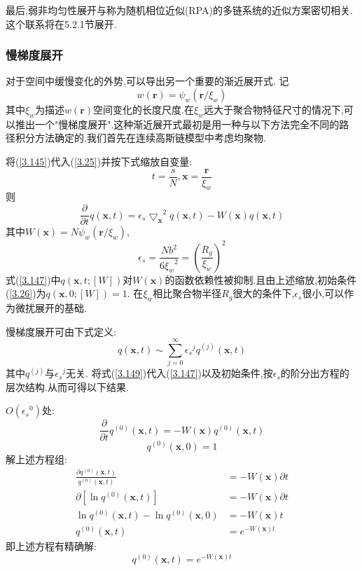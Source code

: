 最后,弱非均匀性展开与称为随机相位近似(RPA)的多链系统的近似方案密切相关.这个联系将在5.2.1节展开.

\subsubsection{慢梯度展开}
对于空间中缓慢变化的外势,可以导出另一个重要的渐近展开式.
记
\begin{equation}
w(\mathbf{r}) = \psi_w(\mathbf{r}/\xi_w) \label{3.145}
\end{equation}
其中$\xi_w$为描述$w(\mathbf{r})$空间变化的长度尺度.在$\xi_w$远大于聚合物特征尺寸的情况下,可以推出一个"慢梯度展开".这种渐近展开式最初是用一种与以下方法完全不同的路径积分方法确定的.我们首先在连续高斯链模型中考虑均聚物.

将(\ref{3.145})代入(\ref{3.25})并按下式缩放自变量:
\begin{equation}
t = \frac{s}{N},	\mathbf{x} = \frac{\mathbf{r}}{\xi_w}
\end{equation}
则
\begin{equation}
\frac{\partial}{\partial t}q(\mathbf{x},t) = \epsilon_s {\bigtriangledown_\mathbf{x}}^2 q(\mathbf{x},t)-W(\mathbf{x})q(\mathbf{x},t) \label{3.147}
\end{equation}
其中$W(\mathbf{x}) = N\psi_w(\mathbf{r}/\xi_w)$,
\begin{equation}
\epsilon_s = \frac{N b^2}{6 {\xi_w}^2} = (\frac{R_g}{\xi_w})^2
\end{equation}	
式(\ref{3.147})中$q(\mathbf{x},t;[W])$对$W(\mathbf{x})$的函数依赖性被抑制.且由上述缩放,初始条件(\ref{3.26})为$q(\mathbf{x},0;[W]) = 1$.
在$\xi_w$相比聚合物半径$R_g$很大的条件下,$\epsilon_s$很小,可以作为微扰展开的基础.

慢梯度展开可由下式定义:
\begin{equation}
q(\mathbf{x},t) \sim \sum_{j=0}^{\infty} {\epsilon_s}^j q^{(j)}(\mathbf{x},t) \label{3.149}
\end{equation}
其中$q^{(j)}$与${\epsilon_s}^j$无关.
将式(\ref{3.149})代入(\ref{3.147})以及初始条件,按$\epsilon_s$的阶分出方程的层次结构.从而可得以下结果.

$O({\epsilon_s}^0)$处:
\begin{equation}
\frac{\partial}{\partial t}q^{(0)}(\mathbf{x},t) = -W(\mathbf{x}) q^{(0)}(\mathbf{x},t)
\end{equation}
\begin{equation}
q^{(0)}(\mathbf{x},0) = 1
\end{equation}
解上述方程组:
$$
\begin{aligned}
\frac{\partial q^{(0)}(\mathbf{x},t)}{q^{(0)}(\mathbf{x},t)} &= -W(\mathbf{x})\partial t\\
\partial[\ln q^{(0)}(\mathbf{x},t)] &= -W(\mathbf{x})\partial t\\
\ln q^{(0)}(\mathbf{x},t) - \ln q^{(0)}(\mathbf{x},0) &= -W(\mathbf{x})t\\
q^{(0)}(\mathbf{x},t) &= e^{-W(\mathbf{x})t}
\end{aligned}
$$
即上述方程有精确解:
\begin{equation}
q^{(0)}(\mathbf{x},t) = e^{-W(\mathbf{x})t} \label{3.152}
\end{equation}

